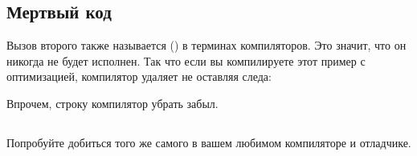 \subsection{Мертвый код}

Вызов второго \printf также называется  () 
в терминах компиляторов.
Это значит, что он никогда не будет исполнен.
Так что если вы компилируете этот пример с оптимизацией, компилятор удаляет  не оставляя следа:



Впрочем, строку  компилятор убрать забыл.


\subsection{\Exercise}

Попробуйте добиться того же самого в вашем любимом компиляторе и отладчике.

